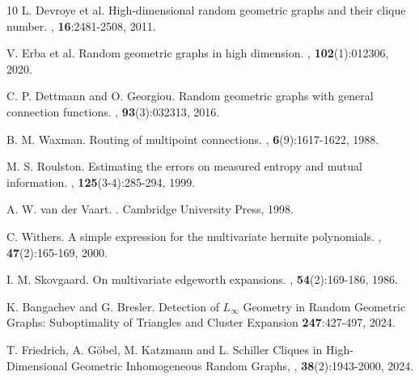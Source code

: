 \documentclass{article}
\begin{document}
\begin{thebibliography}{10}
    L. Devroye et al.
    \newblock High-dimensional random geometric graphs and their clique number.
    , \textbf{16}:2481-2508, 2011.
    
    V. Erba et al.
    \newblock Random geometric graphs in high dimension.
    , \textbf{102}(1):012306, 2020.
    
    C. P. Dettmann and O. Georgiou.
    \newblock Random geometric graphs with general connection functions.
    , \textbf{93}(3):032313, 2016.
    
    B. M. Waxman.
    \newblock Routing of multipoint connections.
    , \textbf{6}(9):1617-1622, 1988.
    
    M. S. Roulston.
    \newblock Estimating the errors on measured entropy and mutual information.
    , \textbf{125}(3-4):285-294, 1999.
    
    A. W. van der Vaart.
    .
    \newblock Cambridge University Press, 1998.
    
    C. Withers.
    \newblock A simple expression for the multivariate hermite polynomials.
    , \textbf{47}(2):165-169, 2000.
    
    I. M. Skovgaard.
    \newblock On multivariate edgeworth expansions.
    , \textbf{54}(2):169-186, 1986.

    K. Bangachev and G. Bresler.
    \newblock Detection of $L_{\infty}$ Geometry in Random Geometric Graphs: Suboptimality of Triangles and Cluster Expansion
     \textbf{247}:427-497, 2024.

    T. Friedrich, A. Göbel, M. Katzmann and L. Schiller
    \newblock Cliques in High-Dimensional Geometric Inhomogeneous Random Graphs,
    , \textbf{38}(2):1943-2000, 2024.


\end{thebibliography}
\end{document}
